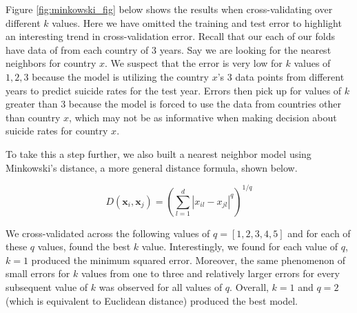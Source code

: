 \documentclass{article}
\begin{document}
\begin{multicols}{2}
Figure \ref{fig:minkowski_fig} below shows the results when cross-validating over different $k$ values. Here we have omitted the training and test error to highlight an interesting trend in cross-validation error. Recall that our each of our folds have data of from each country of $3$ years. Say we are looking for the nearest neighbors for country $x$. We suspect that the error is very low for $k$ values of $1, 2, 3$ because the model is utilizing the country $x$'s $3$ data points from different years to predict suicide rates for the test year. Errors then pick up for values of $k$ greater than $3$ because the model is forced to use the data from countries other than country $x$, which may not be as informative when making decision about suicide rates for country $x$. 
{}

To take this a step further, we also built a nearest neighbor model using Minkowski's distance, a more general distance formula, shown below.

\[D\left(\mathbf{x}_{i}, \mathbf{x}_{j}\right)=\left(\sum_{l=1}^{d}\left|x_{i l}-x_{j l}\right|^{q}\right)^{1/q}\]

We cross-validated across the following values of $q = [1, 2, 3, 4, 5]$ and for each of these $q$ values, found the best $k$ value. Interestingly, we found for each value of $q$, $k = 1$ produced the minimum squared error. Moreover, the same phenomenon of small errors for $k$ values from one to three and relatively larger errors for every subsequent value of $k$ was observed for all values of $q$. Overall, $k = 1$ and $q = 2$ (which is equivalent to Euclidean distance) produced the best model.


\end{multicols}
\end{document}
